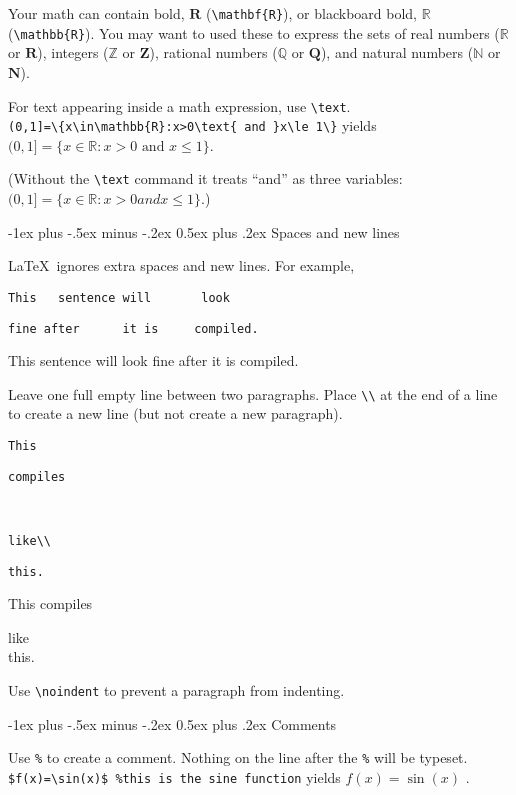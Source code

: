 \documentclass[10pt,landscape,letterpaper]{article}
\makeatletter
\renewcommand{\section}{\@startsection{section}{1}{0mm}%
                                {-1ex plus -.5ex minus -.2ex}%
                                {0.5ex plus .2ex}%
                                {\sffamily\large}}
\makeatother
\begin{document}
\begin{multicols}{3}
Your math can contain bold, $\mathbf{R}$ (\verb!\mathbf{R}!), or blackboard bold, $\mathbb{R}$ (\verb!\mathbb{R}!). 
You may want to used these to express the sets of real numbers ($\mathbb{R}$ or $\mathbf{R}$), integers ($\mathbb{Z}$ or $\mathbf{Z}$), rational numbers ($\mathbb{Q}$ or $\mathbf{Q}$), and natural numbers ($\mathbb{N}$ or $\mathbf{N}$).

For text appearing inside a math expression, use \verb!\text!.\\
\verb!(0,1]=\{x\in\mathbb{R}:x>0\text{ and }x\le 1\}! yields\\
$(0,1]=\{x\in\mathbb{R}:x>0\text{ and }x\le 1\}$. 

(Without the \verb!\text! command it treats ``and'' as three variables: $(0,1]=\{x\in\mathbb{R}:x>0 and x\le 1\}$.)

\section{Spaces and new lines}

\LaTeX\ ignores extra spaces and new lines. For example, 

\verb!This   sentence will       look!

\verb!fine after      it is     compiled.!

This   sentence will       look
fine after      it is     compiled.

Leave one full empty line between two paragraphs. Place \verb!\\! at the end of a line to create a new line (but not create a new paragraph).

\verb!This!

\verb!compiles!

~

\verb!like\\!

\verb!this.!

This
compiles 

like\\
this.

Use  \verb!\noindent! to prevent a paragraph from indenting.

\section{Comments}

Use \verb!%! to create a comment. Nothing on the line after the \verb!%! will be typeset. \verb!$f(x)=\sin(x)$ %this is the sine function! yields $f(x)=\sin(x)$%
.


\end{multicols}
\end{document}
